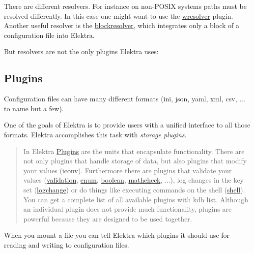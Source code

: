 There are different resolvers. For instance on non-\/\+P\+O\+S\+IX systems paths must be resolved differently. In this case one might want to use the \hyperlink{md_src_plugins_wresolver_README_src_plugins_wresolver_README_md}{wresolver} plugin. Another useful resolver is the \hyperlink{md_src_plugins_blockresolver_README_src_plugins_blockresolver_README_md}{blockresolver}, which integrates only a block of a configuration file into Elektra.

But resolvers are not the only plugins Elektra uses\+:

\subsection*{Plugins}

Configuration files can have many different formats ({\ttfamily ini}, {\ttfamily json}, {\ttfamily yaml}, {\ttfamily xml}, {\ttfamily csv}, ... to name but a few).

One of the goals of Elektra is to provide users with a unified interface to all those formats. Elektra accomplishes this task with {\itshape storage plugins}.

\begin{quote}
In Elektra \hyperlink{doc_tutorials_plugins_md}{Plugins} are the units that encapsulate functionality. There are not only plugins that handle storage of data, but also plugins that modify your values (\hyperlink{md_src_plugins_iconv_README_src_plugins_iconv_README_md}{iconv}). Furthermore there are plugins that validate your values (\hyperlink{md_src_plugins_validation_README_src_plugins_validation_README_md}{validation}, \hyperlink{md_src_plugins_enum_README_src_plugins_enum_README_md}{enum}, \hyperlink{md_src_plugins_boolean_README_src_plugins_boolean_README_md}{boolean}, \hyperlink{md_src_plugins_mathcheck_README_src_plugins_mathcheck_README_md}{mathcheck}, ...), log changes in the key set (\hyperlink{md_src_plugins_logchange_README_src_plugins_logchange_README_md}{logchange}) or do things like executing commands on the shell (\hyperlink{md_src_plugins_shell_README_src_plugins_shell_README_md}{shell}). You can get a complete list of all available plugins with {\ttfamily kdb list}. Although an individual plugin does not provide much functionality, plugins are powerful because they are designed to be used together. \end{quote}


When you mount a file you can tell Elektra which plugins it should use for reading and writing to configuration files.


